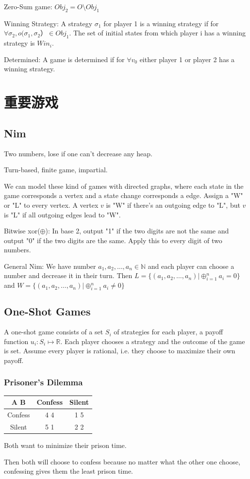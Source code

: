 \documentclass[12pt,a4paper]{ctexrep}
\begin{document}
Zero-Sum game: $Obj_2 = O \setminus Obj_1$

Winning Strategy: A strategy $\sigma_1$ for player 1 is a winning strategy if for $\forall \sigma_2, o(\sigma_1,\sigma_2） \in Obj_1$. The set of initial states from which player i has a winning strategy is $Win_i$.

Determined: A game is determined if for $\forall v_0$ either player 1 or player 2 has a winning strategy.
\section{重要游戏}
\subsection{Nim}
Two numbers, lose if one can't decrease any heap.

Turn-based, finite game, impartial.

We can model these kind of games with directed graphs, where each state in the game corresponds a vertex and a state change corresponds a edge. Assign a "W" or "L" to every vertex. A vertex $v$ is "W" if there's an outgoing edge to "L", but $v$ is "L" if all outgoing edges lead to "W".

Bitwise xor($\oplus$): In base 2, output "1" if the two digits are not the same and output "0" if the two digits are the same. Apply this to every digit of two numbers.

General Nim: We have number $a_1,a_2,\dots,a_n \in \mathbb{N}$ and each player can choose a number and decrease it in their turn. Then $L = \{(a_1,a_2,\dots,a_n)|\oplus_{i=1}^n a_i = 0\}$ and $W = \{(a_1,a_2,\dots,a_n)|\oplus_{i=1}^n a_i \neq 0\}$

\subsection{One-Shot Games}
A one-shot game consists of a set $S_i$ of strategies for each player, a payoff function $u_i: S_i \mapsto \mathbb{R}$. Each player chooses a strategy and the outcome of the game is set. Assume every player is rational, i.e. they choose to maximize their own payoff.
\subsubsection{Prisoner's Dilemma}
\begin{center}
\begin{tabular}{|c|c|c|}
\hline
A  B & Confess & Silent\\
\hline
Confess & 4 4 & 1 5 \\
\hline
Silent & 5 1 & 2 2 \\
\hline

\end{tabular}
Both want to minimize their prison time.
\end{center}
Then both will choose to confess because no matter what the other one choose, confessing gives them the least prison time.
\end{document}

